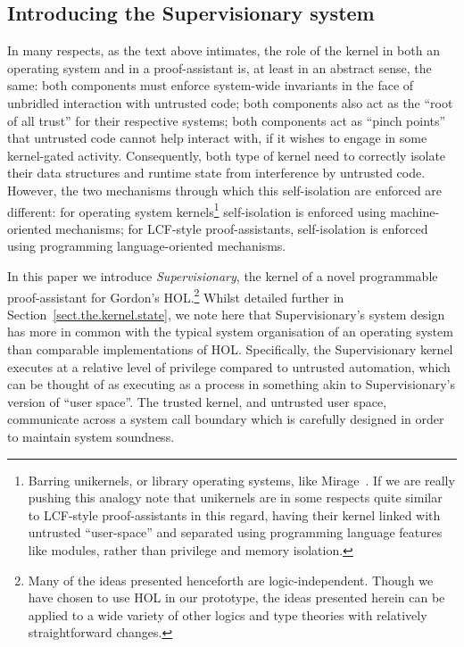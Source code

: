 \documentclass[a4paper, UKenglish, cleveref, autoref, thm-restate, colorlinks]{lipics-v2021}
\begin{document}
\subsection{Introducing the Supervisionary system}

In many respects, as the text above intimates, the role of the kernel in both an operating system and in a proof-assistant is, at least in an abstract sense, the same: both components must enforce system-wide invariants in the face of unbridled interaction with untrusted code; both components also act as the ``root of all trust'' for their respective systems; both components act as ``pinch points'' that untrusted code cannot help interact with, if it wishes to engage in some kernel-gated activity.
Consequently, both type of kernel need to correctly isolate their data structures and runtime state from interference by untrusted code.
However, the two mechanisms through which this self-isolation are enforced are different: for operating system kernels\footnote{Barring unikernels, or library operating systems, like Mirage~\cite{10.1145/2490301.2451167, 10.1145/2451116.2451167}.  If we are really pushing this analogy note that unikernels are in some respects quite similar to LCF-style proof-assistants in this regard, having their kernel linked with untrusted ``user-space'' and separated using programming language features like modules, rather than privilege and memory isolation.} self-isolation is enforced using machine-oriented mechanisms; for LCF-style proof-assistants, self-isolation is enforced using programming language-oriented mechanisms.

In this paper we introduce \emph{Supervisionary}, the kernel of a novel programmable proof-assistant for Gordon's HOL.\footnote{Many of the ideas presented henceforth are logic-independent.  Though we have chosen to use HOL in our prototype, the ideas presented herein can be applied to a wide variety of other logics and type theories with relatively straightforward changes.}
Whilst detailed further in Section~\ref{sect.the.kernel.state}, we note here that Supervisionary's system design has more in common with the typical system organisation of an operating system than comparable implementations of HOL.
Specifically, the Supervisionary kernel executes at a relative level of privilege compared to untrusted automation, which can be thought of as executing as a process in something akin to Supervisionary's version of ``user space''.
The trusted kernel, and untrusted user space, communicate across a system call boundary which is carefully designed in order to maintain system soundness.
\end{document}
